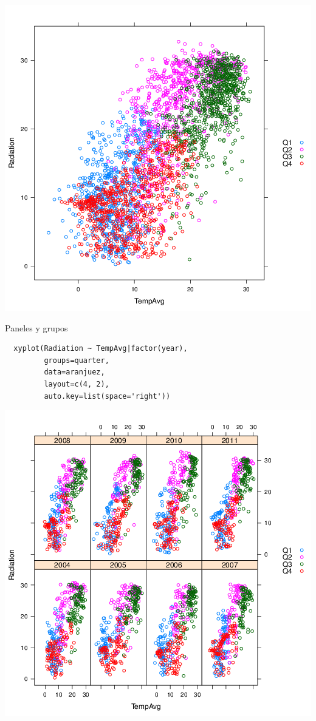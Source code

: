 \documentclass[xcolor={usenames,svgnames,dvipsnames}]{beamer}
\begin{document}
\begin{frame}[label=sec-3-13]{}
\includegraphics[width=.9\linewidth]{figs/xyplotQuarter.png}
\end{frame}

\begin{frame}[fragile,label=sec-3-14]{Paneles y grupos}
 \lstset{language=R,label= ,caption= ,numbers=none}
\begin{lstlisting}
  xyplot(Radiation ~ TempAvg|factor(year),
         groups=quarter,
         data=aranjuez,
         layout=c(4, 2),
         auto.key=list(space='right'))
\end{lstlisting}
\end{frame}

\begin{frame}[label=sec-3-15]{}
\includegraphics[width=.9\linewidth]{figs/xyplotQuarterYear.png}
\end{frame}
\end{document}
